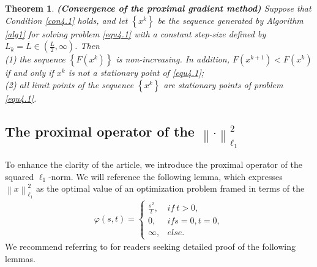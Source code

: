 \documentclass[a4paper,12pt]{article}
\newtheorem{theorem}{Theorem}[section]
\numberwithin{equation}{section}
\begin{document}
\begin{theorem}\label{the4.2}
    \textbf{(Convergence of the proximal gradient method)}
    Suppose that Condition \ref{con4.1} holds, and let $\left\{x^{k}\right\}$ be the sequence generated by Algorithm \ref{alg1} for solving problem \eqref{equ4.1} with a constant step-size defined by $L_{k}=\overline{L}\in (\frac{L}{2},\infty)$. Then \\
    (1) the sequence $\left\{F\left(x^{k}\right)\right\}$ is non-increasing. In addition, $F\left(x^{k+1}\right)<F\left(x^{k}\right)$ if and only if $x^{k}$ is not a stationary point of \eqref{equ4.1}; \\
    (2) all limit points of the sequence $\left\{x^{k}\right\}$ are stationary points of problem \eqref{equ4.1}.
\end{theorem}

\subsection{The proximal operator of the $\left\|\cdot\right\|_{\ell_{1}}^{2}$}\label{sec4.2}

To enhance the clarity of the article, we introduce the proximal operator of the squared $\ell_{1}$-norm. We will reference the following lemma, which expresses $\left\|x\right\|_{\ell_{1}}^{2}$ as the optimal value of an optimization problem framed in terms of the
\begin{align}\label{equ4.4}
    \varphi\left(s,t\right)=
    \left\{             
             \begin{array}{ll}
             \frac{s^{2}}{t}, & if \ t>0, \\
             0, & if s=0,t=0, \\
             \infty, & else. 
             \end{array}
    \right.
\end{align}
We recommend referring to \cite[Section 6.8.2]{BA17} for readers seeking detailed proof of the following lemmas.
\end{document}
